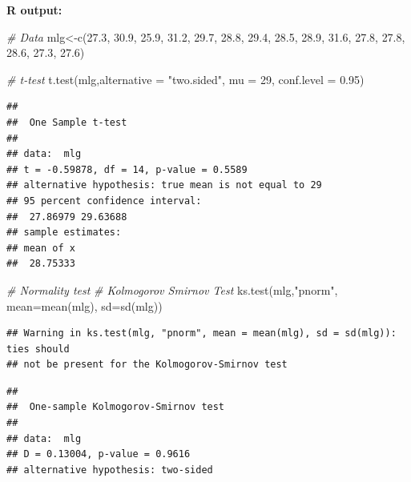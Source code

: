 \documentclass[
]{article}
\newcommand{\AttributeTok}[1]{\textcolor[rgb]{0.77,0.63,0.00}{#1}}
\newcommand{\CommentTok}[1]{\textcolor[rgb]{0.56,0.35,0.01}{\textit{#1}}}
\newcommand{\DecValTok}[1]{\textcolor[rgb]{0.00,0.00,0.81}{#1}}
\newcommand{\FloatTok}[1]{\textcolor[rgb]{0.00,0.00,0.81}{#1}}
\newcommand{\FunctionTok}[1]{\textcolor[rgb]{0.00,0.00,0.00}{#1}}
\newcommand{\NormalTok}[1]{#1}
\newcommand{\OtherTok}[1]{\textcolor[rgb]{0.56,0.35,0.01}{#1}}
\newcommand{\StringTok}[1]{\textcolor[rgb]{0.31,0.60,0.02}{#1}}
\begin{document}
\textbf{R output:}

\begin{Highlighting}[]
\CommentTok{\# Data}
\NormalTok{mlg}\OtherTok{\textless{}{-}}\FunctionTok{c}\NormalTok{(}\FloatTok{27.3}\NormalTok{, }\FloatTok{30.9}\NormalTok{, }\FloatTok{25.9}\NormalTok{, }\FloatTok{31.2}\NormalTok{, }\FloatTok{29.7}\NormalTok{, }
\FloatTok{28.8}\NormalTok{, }\FloatTok{29.4}\NormalTok{, }\FloatTok{28.5}\NormalTok{, }\FloatTok{28.9}\NormalTok{, }\FloatTok{31.6}\NormalTok{,}
\FloatTok{27.8}\NormalTok{, }\FloatTok{27.8}\NormalTok{, }\FloatTok{28.6}\NormalTok{, }\FloatTok{27.3}\NormalTok{, }\FloatTok{27.6}\NormalTok{)}

\CommentTok{\# t{-}test}
\FunctionTok{t.test}\NormalTok{(mlg,}\AttributeTok{alternative =} \StringTok{"two.sided"}\NormalTok{, }\AttributeTok{mu =} \DecValTok{29}\NormalTok{, }\AttributeTok{conf.level =} \FloatTok{0.95}\NormalTok{)}
\end{Highlighting}

\begin{verbatim}
## 
##  One Sample t-test
## 
## data:  mlg
## t = -0.59878, df = 14, p-value = 0.5589
## alternative hypothesis: true mean is not equal to 29
## 95 percent confidence interval:
##  27.86979 29.63688
## sample estimates:
## mean of x 
##  28.75333
\end{verbatim}

\begin{Highlighting}[]
\CommentTok{\# Normality test}
\CommentTok{\# Kolmogorov Smirnov Test}
\FunctionTok{ks.test}\NormalTok{(mlg,}\StringTok{"pnorm"}\NormalTok{, }\AttributeTok{mean=}\FunctionTok{mean}\NormalTok{(mlg), }\AttributeTok{sd=}\FunctionTok{sd}\NormalTok{(mlg))}
\end{Highlighting}

\begin{verbatim}
## Warning in ks.test(mlg, "pnorm", mean = mean(mlg), sd = sd(mlg)): ties should
## not be present for the Kolmogorov-Smirnov test
\end{verbatim}

\begin{verbatim}
## 
##  One-sample Kolmogorov-Smirnov test
## 
## data:  mlg
## D = 0.13004, p-value = 0.9616
## alternative hypothesis: two-sided
\end{verbatim}
\end{document}
